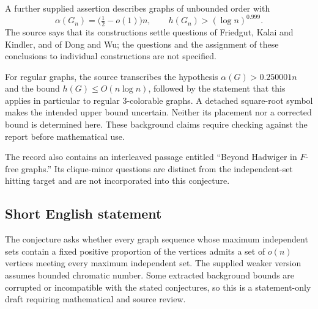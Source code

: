 \documentclass[11pt]{article}
\begin{document}
A further supplied assertion describes graphs of unbounded order with
\[
\alpha(G_n)=\bigl(\tfrac12-o(1)\bigr)n,
\qquad h(G_n)>(\log n)^{0.999}.
\]
The source says that its constructions settle questions of Friedgut, Kalai and Kindler, and of Dong and Wu; the questions and the assignment of these conclusions to individual constructions are not specified.

For regular graphs, the source transcribes the hypothesis \(\alpha(G)>0.250001n\) and the bound \(h(G)\le O(n\log n)\), followed by the statement that this applies in particular to regular \(3\)-colorable graphs. A detached square-root symbol makes the intended upper bound uncertain. Neither its placement nor a corrected bound is determined here. These background claims require checking against the report before mathematical use.

The record also contains an interleaved passage entitled ``Beyond Hadwiger in \(F\)-free graphs.'' Its clique-minor questions are distinct from the independent-set hitting target and are not incorporated into this conjecture.
\subsection{Short English statement}
The conjecture asks whether every graph sequence whose maximum independent sets contain a fixed positive proportion of the vertices admits a set of \(o(n)\) vertices meeting every maximum independent set. The supplied weaker version assumes bounded chromatic number. Some extracted background bounds are corrupted or incompatible with the stated conjectures, so this is a statement-only draft requiring mathematical and source review.
\end{document}
